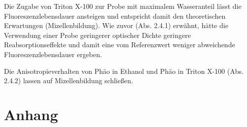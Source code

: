 \documentclass{article}
\begin{document}
Die Zugabe von Triton X-100 zur Probe mit maximalem Wasseranteil lässt die Fluoreszenzlebensdauer ansteigen und entspricht damit den theoretischen Erwartungen (Mizellenbildung). Wie zuvor (Abs. 2.4.1) erwähnt, hätte die Verwendung einer Probe geringerer optischer Dichte geringere Reabsorptionseffekte und damit eine vom Referenzwert weniger abweichende Fluoreszenzlebensdauer ergeben.

Die Anisotropieverhalten von Phäo in Ethanol und Phäo in Triton X-100 (Abs. 2.4.2) lassen auf Mizellenbildung schließen.


\newpage

\section{Anhang}


\begin{figure}
\begin{tabular}{cc}

\end{tabular}
\end{figure}
\end{document}
